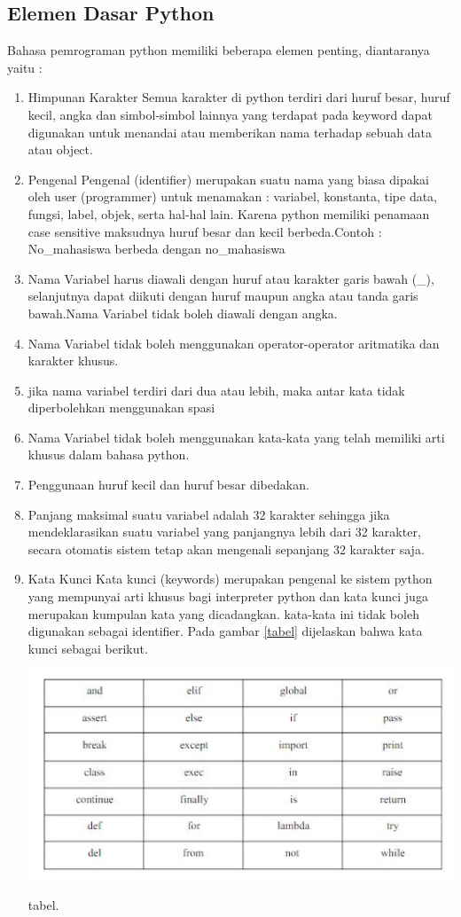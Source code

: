 \subsection{Elemen Dasar Python}
Bahasa pemrograman python memiliki beberapa elemen penting, diantaranya yaitu :
\begin{enumerate}
	\item Himpunan Karakter
		Semua karakter di python terdiri dari huruf besar, huruf kecil, angka dan simbol-simbol lainnya yang terdapat pada keyword dapat digunakan untuk menandai atau memberikan nama terhadap sebuah data atau object.
	\item Pengenal 
		Pengenal (identifier) merupakan suatu nama yang biasa dipakai oleh user (programmer) untuk menamakan : variabel, konstanta, tipe data, fungsi, label, objek, serta hal-hal lain. Karena python memiliki penamaan case sensitive maksudnya huruf besar dan kecil berbeda.Contoh : No_mahasiswa berbeda dengan no_mahasiswa
	\item Nama Variabel harus diawali dengan huruf atau karakter garis bawah (_), selanjutnya dapat diikuti dengan huruf maupun angka atau tanda garis bawah.Nama Variabel tidak boleh diawali dengan angka.
	\item Nama Variabel tidak boleh menggunakan operator-operator aritmatika dan karakter khusus.
	\item jika nama variabel terdiri dari dua atau lebih, maka antar kata tidak diperbolehkan menggunakan spasi
	\item Nama Variabel tidak boleh menggunakan kata-kata yang telah memiliki arti khusus dalam bahasa python.
	\item Penggunaan huruf kecil dan huruf besar dibedakan.
	\item Panjang maksimal suatu variabel adalah 32 karakter sehingga jika mendeklarasikan suatu variabel yang panjangnya lebih dari 32 karakter, secara otomatis sistem tetap akan mengenali sepanjang 32 karakter saja.
	\item Kata Kunci
		Kata kunci (keywords) merupakan pengenal ke sistem python yang mempunyai arti khusus bagi interpreter python dan kata kunci juga merupakan kumpulan kata yang dicadangkan. kata-kata ini tidak boleh digunakan sebagai identifier.
Pada gambar \ref{tabel} dijelaskan bahwa kata kunci sebagai berikut.
\begin{plagiarisme}[ht]
	\centerline{\includegraphics[width=1\textwidth]{plagiarisme/tabel.JPG}}
	\caption{tabel.}
	\label{tabel}
	\end{plagiarisme}
\end{enumerate}

